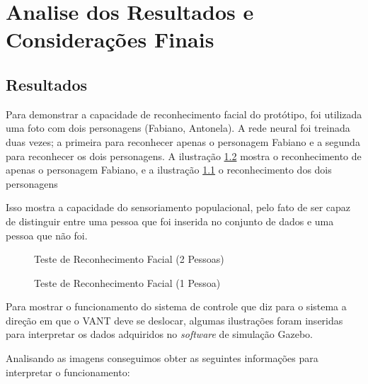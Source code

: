 \chapter{Analise dos Resultados e Considerações Finais}\label{cap:apresAnaRes}

\section{Resultados}

Para demonstrar a capacidade de reconhecimento facial do protótipo, foi utilizada uma foto com dois personagens (Fabiano, Antonela). A rede neural foi treinada duas vezes; a primeira para reconhecer apenas o personagem Fabiano e a segunda para reconhecer os dois personagens. 
A ilustração \ref{fig:eu2} mostra o reconhecimento de apenas o personagem Fabiano, e a ilustração \ref{fig:eu} o reconhecimento dos dois personagens     

Isso mostra a capacidade do sensoriamento populacional, pelo fato de ser capaz de distinguir entre uma pessoa que foi inserida no conjunto de dados e uma pessoa que não foi.  

\begin{figure}[H]
	\centering	
	\caption{Teste de Reconhecimento Facial (2 Pessoas)}
	\def\svgwidth{8cm}
	
	\label{fig:eu}
\end{figure} 

\begin{figure}[H]
	\centering	
	\caption{Teste de Reconhecimento Facial (1 Pessoa)}
	\def\svgwidth{8cm}
	
	\label{fig:eu2}
\end{figure} 

Para mostrar o funcionamento do sistema de controle que diz para o sistema a direção em que o VANT deve se deslocar, algumas ilustrações foram inseridas para interpretar os dados adquiridos no \textit{software } de simulação Gazebo.

Analisando as imagens conseguimos obter as seguintes informações para interpretar o funcionamento:  

